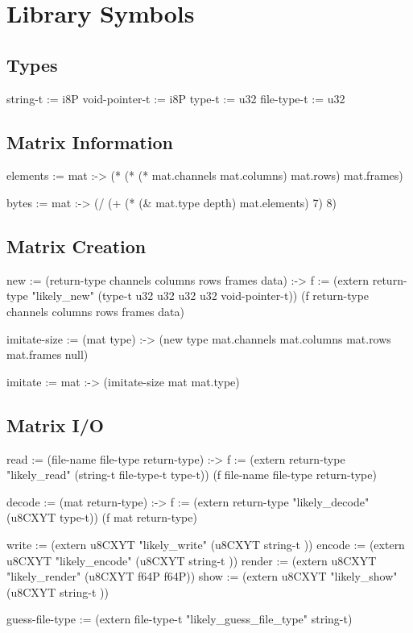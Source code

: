 \documentclass[twoside=false, numbers=noenddot]{scrbook}
\newenvironment{likely}
{ \verbatim }
{ \endverbatim }
\begin{document}
\chapter{Library Symbols}
\section{Types}
\begin{likely}
string-t       := i8P
void-pointer-t := i8P
type-t         := u32
file-type-t    := u32
\end{likely}

\section{Matrix Information}
\begin{likely}
elements :=
  mat :->
    (* (* (* mat.channels mat.columns) mat.rows) mat.frames)

bytes :=
  mat :->
    (/ (+ (* (& mat.type depth) mat.elements) 7) 8)
\end{likely}

\section{Matrix Creation}
\begin{likely}
new :=
  (return-type channels columns rows frames data) :->
  {
    f := (extern return-type
                 "likely_new"
                 (type-t u32 u32 u32 u32 void-pointer-t))
    (f return-type channels columns rows frames data)
  }

imitate-size :=
  (mat type) :->
    (new type mat.channels mat.columns mat.rows mat.frames null)

imitate :=
  mat :->
    (imitate-size mat mat.type)
\end{likely}

\section{Matrix I/O}
\begin{likely}
read :=
  (file-name file-type return-type) :->
  {
    f := (extern return-type
                 "likely_read"
                 (string-t file-type-t type-t))
    (f file-name file-type return-type)
  }

decode :=
  (mat return-type) :->
  {
    f := (extern return-type
                 "likely_decode"
                 (u8CXYT type-t))
    (f mat return-type)
  }

write  := (extern u8CXYT "likely_write"  (u8CXYT string-t ))
encode := (extern u8CXYT "likely_encode" (u8CXYT string-t ))
render := (extern u8CXYT "likely_render" (u8CXYT f64P f64P))
show   := (extern u8CXYT "likely_show"   (u8CXYT string-t ))

guess-file-type :=
  (extern file-type-t "likely_guess_file_type" string-t)
\end{likely}
\end{document}
